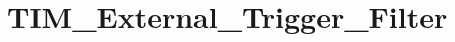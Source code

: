 \hypertarget{group___t_i_m___external___trigger___filter}{\section{T\-I\-M\-\_\-\-External\-\_\-\-Trigger\-\_\-\-Filter}
\label{group___t_i_m___external___trigger___filter}
}
